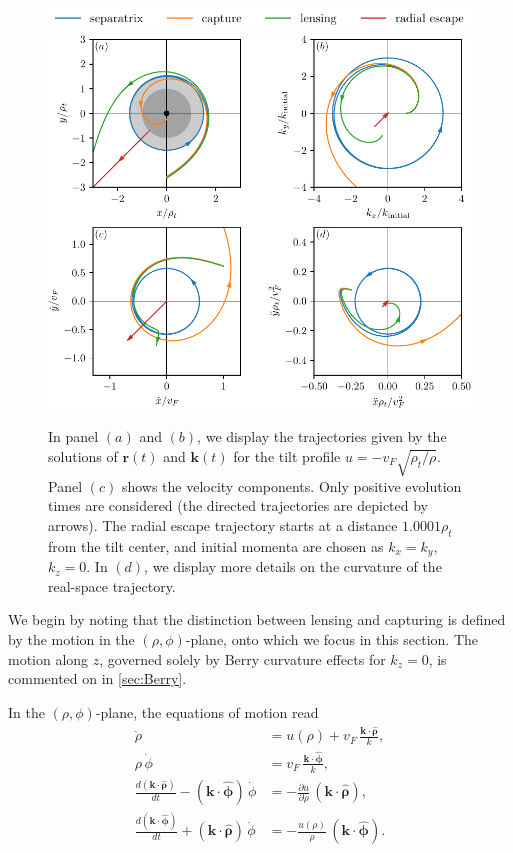 \documentclass[submission, Phys]{SciPost}
\begin{document}
\begin{figure}[ht!]
    \centering
    \includegraphics{fig/fig1_legend.pdf}
    \includegraphics{fig/fig1.pdf}

    \caption{In panel $(a)$ and $(b)$, we display the trajectories given by the solutions of $\bm r(t)$ and $\bm k(t)$ for the tilt profile $u=-v_F\sqrt{\rho_t/\rho}$. Panel $(c)$ shows the velocity components. Only positive evolution times are considered (the directed trajectories are depicted by arrows). The radial escape trajectory starts at a distance $1.0001\rho_t$ from the tilt center, and initial momenta are chosen as $k_x=k_y$, $k_z=0$. In $(d)$, we display more details on the curvature of the real-space trajectory.
    }
    \label{fig:TrajCase}
\end{figure}

We begin by noting that the distinction between lensing and capturing is defined by the motion in the $(\rho,\phi)$-plane, onto which we focus in this section. The motion along $z$, governed solely by Berry curvature effects for $k_z=0$, is commented on in \cref{sec:Berry}.

In the $(\rho,\phi)$-plane, the equations of motion read 
\begin{subequations}
    \begin{align}
        \dot{\rho}&= u(\rho)+v_F\,\frac{\bm k \cdot \hat{\bm \rho}}{k},\label{eq:seom_rho}\\
        \rho \,\dot{\phi} &=v_F\,\frac{\bm k \cdot \hat{\bm \phi}}{k}, \\
        \frac{d(\bm k \cdot \hat{\bm \rho})}{dt}-(\bm k \cdot \hat{\bm \phi})\, \dot{\phi}&= - \frac{\partial u}{\partial \rho}\, (\bm k \cdot \hat{\bm \rho}),\\
        \frac{d(\bm{k}\cdot\hat{\bm \phi})}{dt} +(\bm{k} \cdot \hat{\bm \rho}) \,\dot{\phi}&= -\frac{u(\rho)}{\rho} \,(\bm k \cdot \hat{\bm \phi}).
    \end{align}
    \label{Eq:CylEOM}
\end{subequations}
\end{document}
